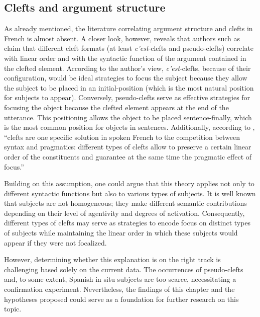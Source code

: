 \subsection{Clefts and argument structure} \label{sub:6.10.2}
As already mentioned, the literature correlating argument structure and clefts in French is almost absent. A closer look, however, reveals that authors such as \textcite{hetzron1975presentative} claim that different cleft formats (at least \textit{c'est}-clefts and pseudo-clefts) correlate with linear order and with the syntactic function of the argument contained in the clefted element. According to the author's view, \textit{c'est}-clefts, because of their configuration, would be ideal strategies to focus the subject because they allow the subject to be placed in an initial-position (which is the most natural position for subjects to appear). Conversely, pseudo-clefts serve as effective strategies for focusing the object because the clefted element appears at the end of the utterance. This positioning allows the object to be placed sentence-finally, which is the most common position for objects in sentences. Additionally, according to \textcite[25]{lambrecht1996information}, ``clefts are one specific solution in spoken French to the competition between syntax and pragmatics: different types of clefts allow to preserve a certain linear order of the constituents and guarantee at the same time the pragmatic effect of focus.”

Building on this assumption, one could argue that this theory applies not only to different syntactic functions but also to various types of subjects. It is well known that subjects are not homogeneous; they make different semantic contributions depending on their level of agentivity and degrees of activation. Consequently, different types of clefts may serve as strategies to encode focus on distinct types of subjects while maintaining the linear order in which these subjects would appear if they were not focalized.

However, determining whether this explanation is on the right track is challenging based solely on the current data. The occurrences of pseudo-clefts and, to some extent, Spanish in situ subjects are too scarce, necessitating a confirmation experiment. Nevertheless, the findings of this chapter and the hypotheses proposed could serve as a foundation for further research on this topic.

